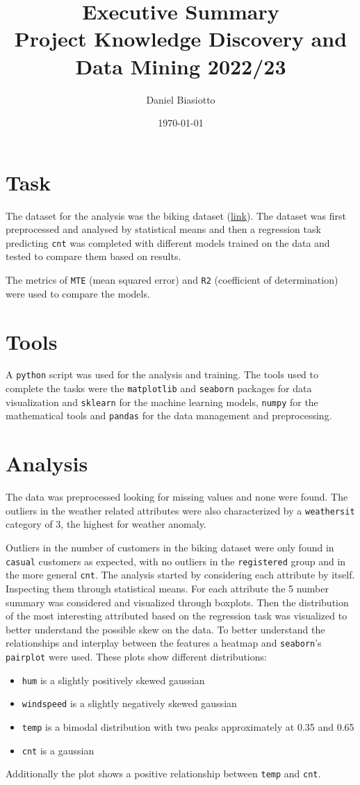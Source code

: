 \documentclass[11pt]{article}
\author{Daniel Biasiotto}
\date{\today}
\title{Executive Summary\\\medskip
\large Project Knowledge Discovery and Data Mining 2022/23}
\begin{document}
\maketitle
\setcounter{secnumdepth}{0}
\section{Task}
\label{sec:org9a4a1b1}
The dataset for the analysis was the biking dataset (\href{https://archive.ics.uci.edu/ml/datasets/Bike+Sharing+Dataset\#}{link}).
The dataset was first preprocessed and analysed by statistical means and then a regression task predicting \texttt{cnt} was completed with different models trained on the data and tested to compare them based on results.

The metrics of \texttt{MTE} (mean squared error) and \texttt{R2} (coefficient of determination) were used to compare the models.
\section{Tools}
\label{sec:orgb6b7020}
A \texttt{python} script was used for the analysis and training.
The tools used to complete the tasks were the \texttt{matplotlib} and \texttt{seaborn} packages for data visualization and \texttt{sklearn} for the machine learning models, \texttt{numpy} for the mathematical tools and \texttt{pandas} for the data management and preprocessing.
\section{Analysis}
\label{sec:orgb467d2b}
The data was preprocessed looking for missing values and none were found.
The outliers in the weather related attributes were also characterized by a \texttt{weathersit} category of 3, the highest for weather anomaly.

Outliers in the number of customers in the biking dataset were only found in \texttt{casual} customers as expected, with no outliers in the \texttt{registered} group and in the more general \texttt{cnt}.
The analysis started by considering each attribute by itself. Inspecting them through statistical means.
For each attribute the 5 number summary was considered and visualized through boxplots.
Then the distribution of the most interesting attributed based on the regression task was visualized to better understand the possible skew on the data.
To better understand the relationships and interplay between the features a heatmap and \texttt{seaborn}'s \texttt{pairplot} were used.
These plots show different distributions:
\begin{itemize}
\item \texttt{hum} is a slightly positively skewed gaussian
\item \texttt{windspeed} is a slightly negatively skewed gaussian
\item \texttt{temp} is a bimodal distribution with two peaks approximately at 0.35 and 0.65
\item \texttt{cnt} is a gaussian
\end{itemize}
Additionally the plot shows a positive relationship between \texttt{temp} and \texttt{cnt}.
\end{document}
